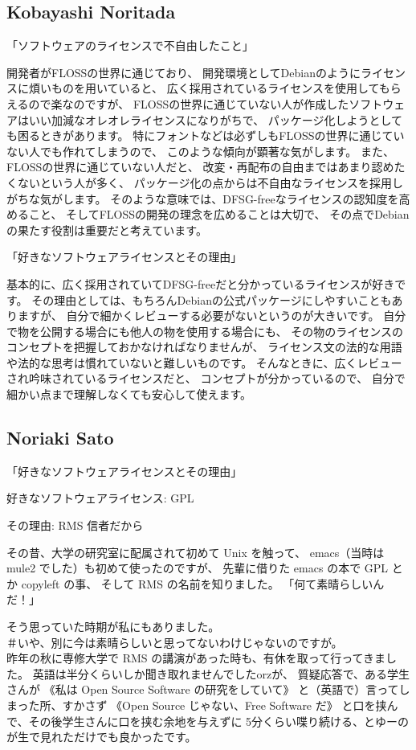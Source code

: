 \documentclass[mingoth,a4paper]{jsarticle}
\begin{document}
\begin{multicols}{2}
{\subsection{Kobayashi Noritada}

「ソフトウェアのライセンスで不自由したこと」

開発者がFLOSSの世界に通じており、
開発環境としてDebianのようにライセンスに煩いものを用いていると、
広く採用されているライセンスを使用してもらえるので楽なのですが、
FLOSSの世界に通じていない人が作成したソフトウェアはいい加減なオレオレライセンスになりがちで、
パッケージ化しようとしても困るときがあります。
特にフォントなどは必ずしもFLOSSの世界に通じていない人でも作れてしまうので、
このような傾向が顕著な気がします。
また、FLOSSの世界に通じていない人だと、
改変・再配布の自由まではあまり認めたくないという人が多く、
パッケージ化の点からは不自由なライセンスを採用しがちな気がします。
そのような意味では、DFSG-freeなライセンスの認知度を高めること、
そしてFLOSSの開発の理念を広めることは大切で、
その点でDebianの果たす役割は重要だと考えています。


「好きなソフトウェアライセンスとその理由」

基本的に、広く採用されていてDFSG-freeだと分かっているライセンスが好きです。
その理由としては、もちろんDebianの公式パッケージにしやすいこともありますが、
自分で細かくレビューする必要がないというのが大きいです。
自分で物を公開する場合にも他人の物を使用する場合にも、
その物のライセンスのコンセプトを把握しておかなければなりませんが、
ライセンス文の法的な用語や法的な思考は慣れていないと難しいものです。
そんなときに、広くレビューされ吟味されているライセンスだと、
コンセプトが分かっているので、
自分で細かい点まで理解しなくても安心して使えます。


\subsection{Noriaki Sato}


「好きなソフトウェアライセンスとその理由」

好きなソフトウェアライセンス: GPL

その理由: RMS 信者だから

その昔、大学の研究室に配属されて初めて Unix を触って、
emacs（当時は mule2 でした）も初めて使ったのですが、
先輩に借りた emacs の本で GPL とか copyleft の事、
そして RMS の名前を知りました。
「何て素晴らしいんだ！」

そう思っていた時期が私にもありました。\\
＃いや、別に今は素晴らしいと思ってないわけじゃないのですが。\\
昨年の秋に専修大学で RMS の講演があった時も、有休を取って行ってきました。
英語は半分くらいしか聞き取れませんでしたorzが、
質疑応答で、ある学生さんが
《私は Open Source Software の研究をしていて》
と（英語で）言ってしまった所、すかさず
《Open Source じゃない、Free Software だ》
と口を挟んで、その後学生さんに口を挟む余地を与えずに
5分くらい喋り続ける、とゆーのが生で見れただけでも良かったです。

}
\end{multicols}
\end{document}
